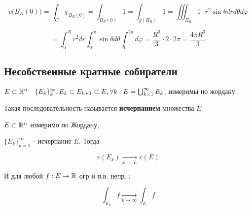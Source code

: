     $$v\big(B_R(0)\big) = \int_C \chi_{B_R(0)} = \int_{B_R(0)} 1 = \int_{g(\Pi_R)} 1 = \iiint_{\Pi_R}1 \cdot r^2 \sin\theta drd\theta d\varphi$$

    $$=\int^R_0 r^2dr\int^\pi_0 \sin\theta d\theta \int^{2\pi}_0 d\varphi = \frac{R^3}{3} \cdot 2 \cdot 2\pi = \frac{4\pi R^3}{3}$$

    \subsection*{Несобственные кратные собиратели}  %

    \begin{definition}
        $E \subset \mathbb{R}^n \quad \{ E_k\}_k^{\infty}, E_k \subset E_{k+1} \subset E, \forall k: E = \bigcup^\infty_{k=1} E_k$, измеримы по жордану.

        Такая последовательность называется \textbf{исчерпанием} множества $E$

    \end{definition}
    \begin{lemma} %
        $E\subset \mathbb{R}^n$ измеримо по Жордану, %
        
        $\{E_k\}_{k=1}^\infty$ - исчерпание $E$. Тогда

        $$v(E_k) \underset{k\to\infty}{\to} v(E)$$

        И для любой $f: E \to \mathbb{R}$ огр и п.в. непр. :

        $$\int_{E_k} f \underset{k\to\infty}{\to} \int_E f$$
        
    \end{lemma}
